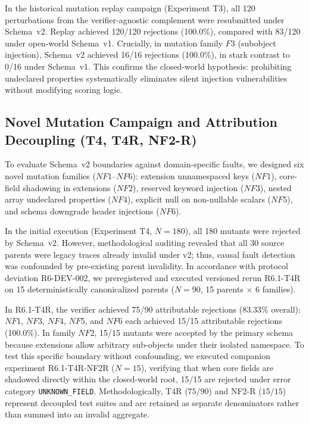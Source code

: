 \documentclass[conference]{IEEEtran}
\begin{document}
In the historical mutation replay campaign (Experiment T3), all 120 perturbations from the verifier-agnostic complement were resubmitted under Schema~v2. Replay achieved 120/120 rejections (100.0\%), compared with 83/120 under open-world Schema~v1. Crucially, in mutation family $F3$ (subobject injection), Schema~v2 achieved 16/16 rejections (100.0\%), in stark contrast to 0/16 under Schema~v1. This confirms the closed-world hypothesis: prohibiting undeclared properties systematically eliminates silent injection vulnerabilities without modifying scoring logic.

\subsection{Novel Mutation Campaign and Attribution Decoupling (T4, T4R, NF2-R)}
\label{sec:r6_t4}
To evaluate Schema~v2 boundaries against domain-specific faults, we designed six novel mutation families ($NF1$--$NF6$): extension unnamespaced keys ($NF1$), core-field shadowing in extensions ($NF2$), reserved keyword injection ($NF3$), nested array undeclared properties ($NF4$), explicit null on non-nullable scalars ($NF5$), and schema downgrade header injections ($NF6$).

In the initial execution (Experiment T4, $N=180$), all 180 mutants were rejected by Schema~v2. However, methodological auditing revealed that all 30 source parents were legacy traces already invalid under v2; thus, causal fault detection was confounded by pre-existing parent invalidity. In accordance with protocol deviation R6-DEV-002, we preregistered and executed versioned rerun R6.1-T4R on 15 deterministically canonicalized parents ($N=90$, 15 parents $\times$ 6 families).

In R6.1-T4R, the verifier achieved 75/90 attributable rejections (83.33\% overall): $NF1$, $NF3$, $NF4$, $NF5$, and $NF6$ each achieved 15/15 attributable rejections (100.0\%). In family $NF2$, 15/15 mutants were accepted by the primary schema because extensions allow arbitrary sub-objects under their isolated namespace. To test this specific boundary without confounding, we executed companion experiment R6.1-T4R-NF2R ($N=15$), verifying that when core fields are shadowed directly within the closed-world root, 15/15 are rejected under error category \texttt{UNKNOWN\_FIELD}. Methodologically, T4R ($75/90$) and NF2-R ($15/15$) represent decoupled test suites and are retained as separate denominators rather than summed into an invalid aggregate.
\end{document}
